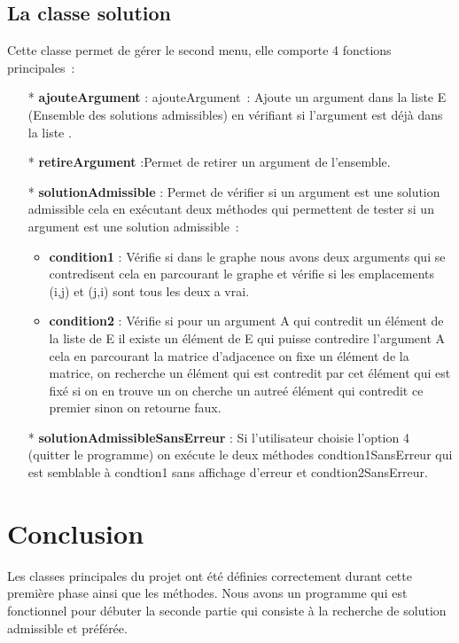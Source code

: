\documentclass[12pt]{article}
\begin{document}
	\subsection{La classe solution}
	Cette classe permet de gérer le second menu, elle comporte 4 fonctions
	principales :
	\begin{itemize}
		\item [*] \textbf{ajouteArgument} : ajouteArgument : Ajoute un argument dans la liste E (Ensemble des solutions admissibles) en vérifiant si l’argument est déjà dans la liste .
		\item [*] \textbf{retireArgument} :Permet de retirer un argument de l’ensemble.
		\item [*] \textbf{solutionAdmissible} : Permet de vérifier si un argument est une solution admissible
		cela en exécutant deux méthodes qui permettent de tester si un argument est une
		solution admissible : 
		\begin{itemize}
			\item \textbf{condition1} : Vérifie si dans le graphe nous avons deux arguments qui se contredisent cela en parcourant le graphe et vérifie si les emplacements (i,j) et (j,i) sont tous les deux a vrai.
			\item \textbf{condition2} : Vérifie si pour un argument A qui contredit un élément de la liste de E il existe un élément de E qui puisse contredire l’argument A cela en parcourant la matrice d’adjacence on fixe un élément de la matrice, on
			recherche un élément qui est contredit par cet élément qui est fixé si on en trouve un on cherche un autreé élément qui contredit ce premier sinon on retourne faux.
		\end{itemize}
	\item [*] \textbf{solutionAdmissibleSansErreur} : Si l’utilisateur choisie l’option 4 (quitter le programme) on exécute le deux méthodes condtion1SansErreur qui est semblable à condtion1 sans affichage d’erreur et condtion2SansErreur.
	\end{itemize}

	
	\section{Conclusion}
	Les classes principales du projet ont été définies correctement durant cette première phase ainsi que les méthodes. Nous avons un programme qui est fonctionnel pour débuter la seconde partie qui
	consiste à la recherche de solution admissible et préférée.
	
		
		
	\bigskip
	
\end{document}
